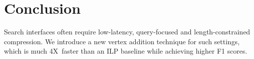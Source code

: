 \documentclass[11pt,a4paper]{article}
\newcommand{\speedup}[0]{4X~}
\begin{document}
\section{Conclusion}

Search interfaces often require low-latency, query-focused and length-constrained compression. We introduce a new vertex addition technique for such settings, which is much \speedup faster than an ILP baseline while achieving higher F1 scores. 



%



\end{document}
